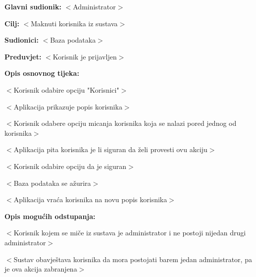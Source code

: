 					\noindent {}
					\begin{packed_item}

						\item \textbf{Glavni sudionik:} $<$Administrator$>$
						\item \textbf{Cilj:} $<$Maknuti korisnika iz sustava$>$
						\item \textbf{Sudionici:} $<$Baza podataka$>$
						\item \textbf{Preduvjet:} $<$Korisnik je prijavljen$>$
						\item \textbf{Opis osnovnog tijeka:}

						\item[] \begin{packed_enum}

							\item $<$Korisnik odabire opciju "Korisnici"$>$
							\item $<$Aplikacija prikazuje popis korisnika$>$
							\item $<$Korisnik odabere opciju micanja korisnika koja se nalazi pored jednog od korisnika$>$
							\item $<$Aplikacija pita korisnika je li siguran da želi provesti ovu akciju$>$
							\item $<$Korisnik odabire opciju da je siguran$>$
							\item $<$Baza podataka se ažurira$>$
							\item $<$Aplikacija vraća korisnika na novu popis korisnika$>$

						\end{packed_enum}

						\item \textbf{Opis mogućih odstupanja:}

						\item[] \begin{packed_item}

							\item[3.a] $<$Korisnik kojem se miče iz sustava je administrator i ne postoji nijedan
							drugi administrator$>$
							\item[] \begin{packed_enum}

								\item $<$Sustav obavještava korisnika da mora postojati
								barem jedan administrator, pa je ova akcija zabranjena$>$

							\end{packed_enum}

						\end{packed_item}
					\end{packed_item}

